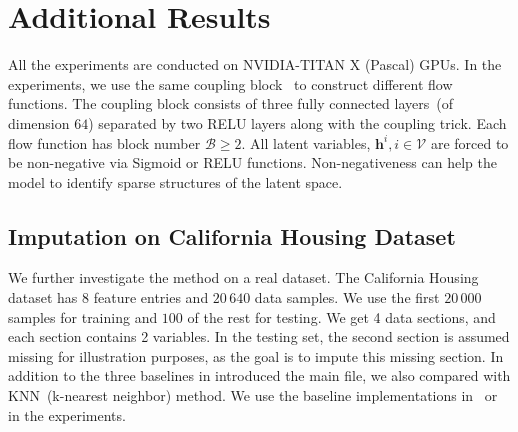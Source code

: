 \documentclass[sigconf, anonymous, review]{acmart}
\theoremstyle{plain}
\theoremstyle{definition}
\theoremstyle{remark}
\begin{document}
\section{Additional Results}\label{sec:exp_supp}

 All the experiments are conducted on NVIDIA-TITAN X (Pascal) GPUs. 
In  the experiments, we use the same  coupling block~\cite{Dinh2016DensityEU} to construct different flow functions. 
The coupling block consists of three fully connected layers~(of dimension $64$) separated by two RELU layers along with the coupling trick. 
Each flow function has block number $\mathcal{B} \geqslant 2$. 
All latent variables, $\mathbf{h}^{i}, i \in \mathcal{V}$ are forced to be non-negative via Sigmoid or RELU functions. 
Non-negativeness can help the model to identify sparse structures of the latent space. 






\subsection{Imputation on California Housing Dataset}

We further investigate the method on a real dataset.  
The California Housing dataset  has 8 feature entries and $20\,640$ data samples. 
We use the first $20\,000$ samples for training  and $100$ of the rest for testing.  
We get  4 data sections, and each section contains 2 variables. 
In the testing set, the second section is assumed missing for illustration purposes, as the goal is to impute this missing section. In addition to the three baselines in introduced the main file, we also compared with KNN~(k-nearest neighbor) method. We use the baseline implementations in~\cite{scikit-learn} or~\cite{Impyute} in the experiments. 
\end{document}
